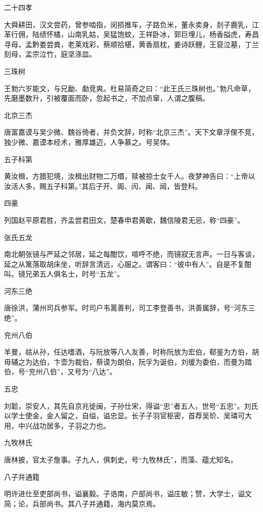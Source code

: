 \documentclass[a4paper,12pt,UTF8,twoside]{ctexbook}
\begin{document}
    二十四孝
    
    大舜耕田，汉文尝药，曾参啮指，闵损推车，子路负米，董永卖身，剡子鹿乳，江革行佣，陆绩怀橘，山南乳姑，吴猛饱蚊，王祥卧冰，郭巨埋儿，杨香搤虎，寿昌寻母，孟黔娄尝粪，老莱戏彩，蔡顺拾椹，黄香扇枕，姜诗跃鲤，王裒泣墓，丁兰刻母，孟宗泣竹，庭坚涤皿。
    
    三珠树
    
    王勃六岁能文，与兄勔、勮竞爽。杜易简奇之曰：“此王氏三珠树也。”勃凡命草，先磨墨数升，引被覆面而卧，忽起书之，不加点窜，人谓之腹稿。
    
    北京三杰
    
    唐富嘉谟与吴少微、魏谷倚者，并负文辞，时称“北京三杰”。天下文章浮俚不竞，独少微、嘉谟本经术，雅厚雄迈，人争慕之。号吴体。
    
    五子科第
    
    黄汝楫，方腊犯境，汝楫出财物二万缗，赎被掠士女千人。夜梦神告曰：“上帝以汝活人多，赐五子科第。”其后子开、阁、闶、闻、闿，皆登科。
    
    四豪
    
    列国赵平原君胜，齐孟尝君田文，楚春申君黄歇，魏信陵君无忌，称“四豪”。
    
    张氏五龙
    
    南北朝张镜与严延之邻居，延之每酣饮，喧呼不绝，而镜寂无言声。一日与客谈，延之从篱落取胡床坐，听辞言清远，心服之。谓客曰：“彼中有人”。自是不复酣叫。镜兄弟五人俱名士，时号“五龙”。
    
    河东三绝
    
    唐徐洪，蒲州司兵参军。时司户韦暠善判，司工李登善书，洪善属辞，号“河东三绝”。
    
    兖州八伯
    
    羊曼，祜从孙，任达嗜酒，与阮放等八人友善，时称阮放为宏伯，郗鉴为方伯，胡毋辅之为达伯，卞壶为裁伯，蔡谟为朗伯，阮孚为诞伯，刘缓为委伯，而曼为踏伯，号“兖州八伯”，又号为“八达”。
    
    五忠
    
    刘韐，崇安人，其先自京兆徙闽，子孙仕宋，得谥“忠”者五人，世号“五忠”。刘氏以学士使金，金人留之，自缢，谥忠显。长子子羽官枢密，首荐吴玠、吴璘可大用，中兴战功居多，子羽之力也。
    
    九牧林氏
    
    唐林披，官太子詹事。子九人，俱刺史，号“九牧林氏”，而藻、蕴尤知名。
    
    八子并通籍
    
    明许进仕至吏部尚书，谥襄毅。子诰南，户部尚书，谥庄敏；赞，大学士，谥文简；论，兵部尚书。其八子并通籍，海内莫京焉。
    
\end{document}
